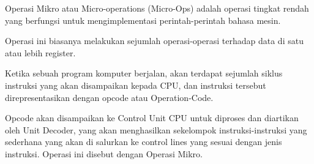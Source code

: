 Operasi Mikro atau Micro-operations (Micro-Ops) adalah operasi tingkat rendah
yang berfungsi untuk mengimplementasi perintah-perintah bahasa mesin.

Operasi ini biasanya melakukan sejumlah operasi-operasi terhadap data di satu
atau lebih register.

Ketika sebuah program komputer berjalan, akan terdapat sejumlah siklus instruksi yang akan
disampaikan kepada CPU, dan instruksi tersebut direpresentasikan dengan opcode atau Operation-Code.

Opcode akan disampaikan ke Control Unit CPU untuk diproses dan diartikan oleh Unit Decoder, yang
akan menghasilkan sekelompok instruksi-instruksi yang sederhana yang akan di salurkan ke
control lines yang sesuai dengan jenis instruksi. Operasi ini disebut dengan Operasi Mikro.
